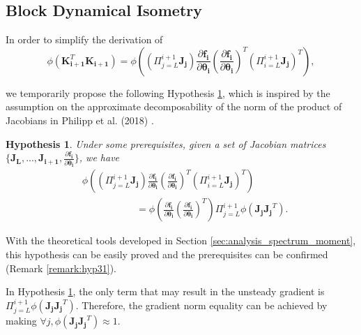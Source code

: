 \documentclass[10pt,journal,compsoc]{IEEEtran}
\newcommand{\modify}[1]{{ #1}}
\newtheorem{assumption}{Hypothesis}[section]
\begin{document}
\subsection{Block Dynamical Isometry}

In order to simplify the derivation of
\begin{equation}
    \phi\left(\mathbf{K}^T_{\mathbf{i+1}}\mathbf{K_{i+1}}\right)\!=\!\phi\left(\left(\Pi_{j=L}^{i+1}\mathbf{J_j}\right)\frac{\partial \mathbf{f_{i}}}{\partial \mathbf{\theta_{i}}}\left(\frac{\partial \mathbf{f_{i}}}{\partial \mathbf{\theta_{i}}}\right)^T\left(\Pi_{i=L}^{i+1}\mathbf{J_j}\right)^T\right),
\end{equation}
\modify{we temporarily propose the following Hypothesis \ref{assumption:jacobian_breakdown}, which is inspired by the assumption on the approximate decomposability of the norm of the product of Jacobians in Philipp et al. (2018) \cite{philipp2018gradients}.
\begin{assumption}
Under some prerequisites, given a set of Jacobian matrices $\{\mathbf{J_{L},...,\mathbf{J_{i+1}}}, \frac{\partial \mathbf{f_{i}}}{\partial \mathbf{\theta_{i}}}\}$, we have
\begin{equation}
\begin{split}
    &\phi\left(\left(\Pi_{j=L}^{i+1}\mathbf{J_j}\right)\frac{\partial \mathbf{f_{i}}}{\partial \mathbf{\theta_{i}}}\left(\frac{\partial \mathbf{f_{i}}}{\partial \mathbf{\theta_{i}}}\right)^T\left(\Pi_{i=L}^{i+1}\mathbf{J_j}\right)^T\right)\\
    &~~~~~~~~~~~~~~~~~~~~~~~~~=\phi\left(\frac{\partial \mathbf{f_{i}}}{\partial \mathbf{\theta_{i}}}\left(\frac{\partial \mathbf{f_{i}}}{\partial \mathbf{\theta_{i}}}\right)^T\right)\Pi_{j=L}^{i+1}\phi\left(\mathbf{J_jJ_j}^T\right).
\end{split}
\label{equ:gradient_phi_decomposite}
\end{equation}
\label{assumption:jacobian_breakdown}
\end{assumption}
With the theoretical tools developed in Section \ref{sec:analysis_spectrum_moment}, this hypothesis can be easily proved and the prerequisites can be confirmed (Remark \ref{remark:hyp31}).
} In Hypothesis \ref{assumption:jacobian_breakdown}, the only term that may result in the unsteady gradient is $\Pi_{j=L}^{i+1}\phi(\mathbf{J_jJ_j}^T)$. Therefore, the gradient norm equality can be achieved by making $\forall j,\phi(\mathbf{J_jJ_j}^T)\approx1$.
\end{document}
